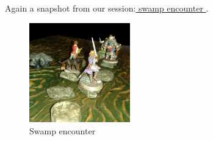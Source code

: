 Again a snapshot from our session:\hyperref[fig:Swamp-encounter-410834455]{ swamp encounter } . \\

\begin{figure}[h]
	\centering
	\includegraphics[width=0.39\textwidth]{images/Swamp-encounter-410834455.jpg}
	\caption{Swamp encounter}
	\label{fig:Swamp-encounter-410834455}
\end{figure}

